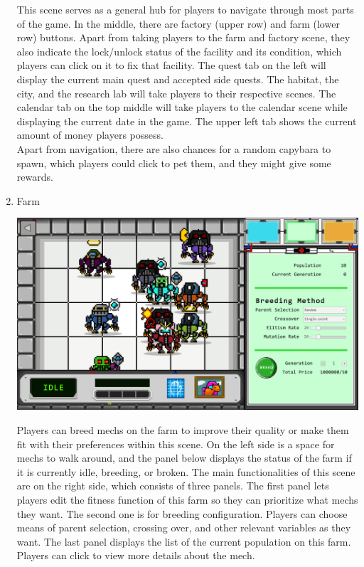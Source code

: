 \documentclass[12pt,oneside,openright,a4paper]{cpe-english-project}
\begin{document}
\begin{enumerate}
\begin{minipage}[c]{\textwidth}
	\end{minipage}
	This scene serves as a general hub for players to navigate through most parts of the game. In the middle, there are factory (upper row) and farm (lower row) buttons. Apart from taking players to the farm and factory scene, they also indicate the lock/unlock status of the facility and its condition, which players can click on it to fix that facility. The quest tab on the left will display the current main quest and accepted side quests. The habitat, the city, and the research lab will take players to their respective scenes. The calendar tab on the top middle will take players to the calendar scene while displaying the current date in the game. The upper left tab shows the current amount of money players possess. \\
	Apart from navigation, there are also chances for a random capybara to spawn, which players could click to pet them, and they might give some rewards. 

	\item Farm \\
	\begin{minipage}[c]{\textwidth}\centering
	\includegraphics[width=14cm]{figure/screenshot/screenshot-farm.png}
	\end{minipage}
	Players can breed mechs on the farm to improve their quality or make them fit with their preferences within this scene. On the left side is a space for mechs to walk around, and the panel below displays the status of the farm if it is currently idle, breeding, or broken. The main functionalities of this scene are on the right side, which consists of three panels. The first panel lets players edit the fitness function of this farm so they can prioritize what mechs they want. The second one is for breeding configuration. Players can choose means of parent selection, crossing over, and other relevant variables as they want. The last panel displays the list of the current population on this farm. Players can click to view more details about the mech.


\end{enumerate}
\end{document}
